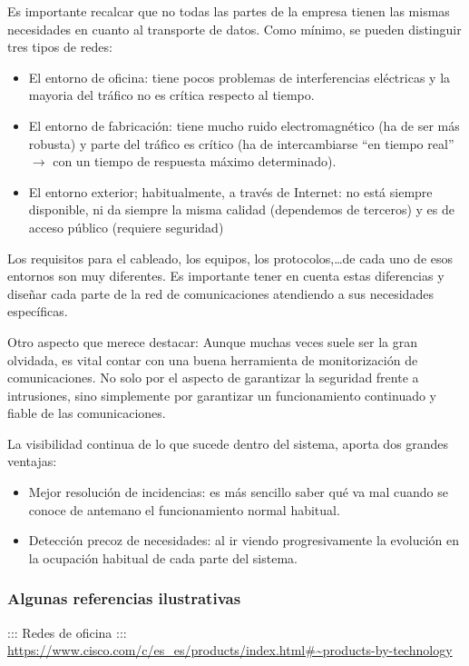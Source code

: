 \documentclass[spanish,12pt,a4paper,final,oneside]{book}
\begin{document}
Es importante recalcar que no todas las partes de la empresa tienen las mismas necesidades en cuanto al transporte de datos. Como mínimo, se pueden distinguir tres tipos de redes:
\begin{itemize}
\item El entorno de oficina: tiene pocos problemas de interferencias eléctricas y la mayoria del tráfico no es crítica respecto al tiempo.
\item El entorno de fabricación: tiene mucho ruido electromagnético (ha de ser más robusta) y parte del tráfico es crítico (ha de intercambiarse ``en tiempo real'' $\rightarrow$ con un tiempo de respuesta máximo determinado).
\item El entorno exterior; habitualmente, a través de Internet: no está siempre disponible, ni da siempre la misma calidad (dependemos de terceros) y es de acceso público (requiere seguridad)
\end{itemize}
Los requisitos para el cableado, los equipos, los protocolos,\ldots de cada uno de esos entornos son muy diferentes.
Es importante tener en cuenta estas diferencias y diseñar cada parte de la red de comunicaciones atendiendo a sus necesidades específicas.

\vspace{0.7cm}
Otro aspecto que merece destacar: Aunque muchas veces suele ser la gran olvidada, es vital contar con una buena herramienta de monitorización de comunicaciones. No solo por el aspecto de garantizar la seguridad frente a intrusiones, sino simplemente por garantizar un funcionamiento continuado y fiable de las comunicaciones.

La visibilidad continua de lo que sucede dentro del sistema, aporta dos grandes ventajas:
\begin{itemize}
\item Mejor resolución de incidencias: es más sencillo saber qué va mal cuando se conoce de antemano el funcionamiento normal habitual.
\item Detección precoz de necesidades: al ir viendo progresivamente la evolución en la ocupación habitual de cada parte del sistema.
\end{itemize} 

\subsubsection*{Algunas referencias ilustrativas}
::: Redes de oficina :::
\\ \url{https://www.cisco.com/c/es_es/products/index.html#~products-by-technology}
\end{document}
